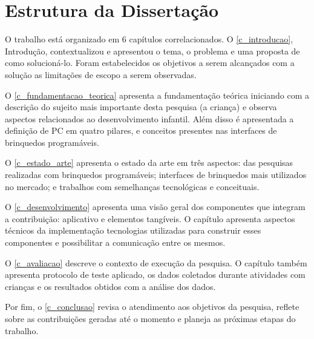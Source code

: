 \section{Estrutura da Dissertação}
\label{s_cintro_estrutura}

O trabalho está organizado em 6 capítulos correlacionados. O \autoref{c_introducao}, Introdução, contextualizou e apresentou o tema, o problema e uma proposta de como solucioná-lo. Foram estabelecidos os objetivos a serem alcançados com a solução as limitações de escopo a serem observadas.

O \autoref{c_fundamentacao_teorica} apresenta a fundamentação teórica iniciando com a descrição do sujeito mais importante desta pesquisa (a criança) e observa aspectos relacionados ao desenvolvimento infantil. Além disso é apresentada a definição de \ac{PC} em quatro pilares, e conceitos presentes nas interfaces de brinquedos programáveis.

O \autoref{c_estado_arte} apresenta o estado da arte em três aspectos: das pesquisas realizadas com brinquedos programáveis; interfaces de brinquedos mais utilizados no mercado; e trabalhos com semelhanças tecnológicas e conceituais.

O \autoref{c_desenvolvimento} apresenta uma visão geral dos componentes que integram a contribuição: aplicativo e elementos tangíveis. O capítulo apresenta aspectos técnicos da implementação tecnologias utilizadas para construir esses componentes e possibilitar a comunicação entre os mesmos.

O \autoref{c_avaliacao} descreve o contexto de execução da pesquisa. O capítulo também apresenta protocolo de teste aplicado, os dados coletados durante atividades com crianças e os resultados obtidos com a análise dos dados.

Por fim, o \autoref{c_conclusao} revisa o atendimento aos objetivos da pesquisa, reflete sobre as contribuições geradas até o momento e planeja as próximas etapas do trabalho.


